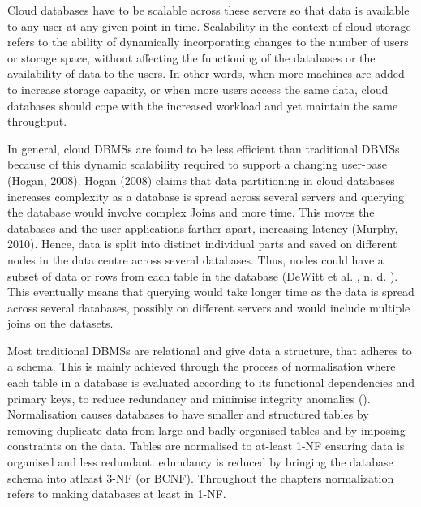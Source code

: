 Cloud databases have to be scalable across these servers so that data is
available to any user at any given point in time.  Scalability in the context of
cloud storage refers to the ability of dynamically incorporating changes to the
number of users or storage space,   without affecting the functioning of the
databases or the availability of data to the users.  In other words,   when more
machines are added to increase storage capacity,   or when more users access the
same data,   cloud databases should cope with the increased workload and yet
maintain the same throughput. 

In general,   cloud \acp{DBMS} are found to be less efficient than traditional
\acp{DBMS} because of this dynamic scalability required to
support a changing user-base (Hogan,   2008).  Hogan (2008) claims that data
partitioning in cloud databases increases complexity as a database is spread
across several servers and querying the database would involve complex Joins and
more time.  This moves the databases and the user applications farther apart,  
increasing latency (Murphy,   2010).  Hence,   data is split into distinct individual
parts and saved on different nodes in the data centre across several databases. 
Thus,   nodes could have a subset of data or rows from each table in the database
(DeWitt et al. ,   n. d. ). This eventually means that querying would take longer time
as the data is spread across several databases,   possibly on different servers
and would include multiple joins on the datasets. 

Most traditional \acp{DBMS} are relational and give data a structure,   that
adheres to a schema.  This is mainly achieved through the process of
normalisation where each table in a database is evaluated according to its functional dependencies
and primary keys,   to reduce redundancy and minimise integrity anomalies
().  Normalisation causes databases to have smaller and
structured tables by removing duplicate data from large and badly organised
tables and by imposing constraints on the data.  Tables are normalised to
at-least \ac{1-NF} ensuring data is organised and less redundant. edundancy is
reduced by bringing the database schema into atleast \ac{3-NF} (or \ac{BCNF}).
Throughout the chapters normalization refers to making databases at least in \ac{1-NF}.

